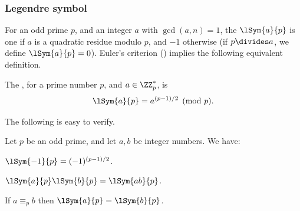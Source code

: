 \subsubsection{Legendre symbol}


For an odd prime $p$, and an integer $a$ with $\gcd(a,n)=1$, the
 $\lSym{a}{p}$ is one if $a$ is a quadratic
residue modulo $p$, and $-1$ otherwise (if $p \divides a$, we define
$\lSym{a}{p} = 0$). Euler's criterion ()
implies the following equivalent definition.


\begin{defn}
    The , for a prime number $p$, and $a\in
    \ZZ_p^*$, is
    \begin{align*}
        \lSym{a}{p} = a^{(p-1)/2} \pmod p.
    \end{align*}
\end{defn}

The following is easy to verify.
\begin{lemma}
    Let $p$ be an odd prime, and let $a,b$ be integer numbers. We have:
    \begin{compactenumi}
        \item $\lSym{-1}{p} = (-1)^{(p-1)/2}$.
        \item $\lSym{a}{p} \lSym{b}{p} = \lSym{ab}{p}$.
        \item If $a \equiv_p b$ then $\lSym{a}{p} = \lSym{b}{p}$.
    \end{compactenumi}
\end{lemma}


